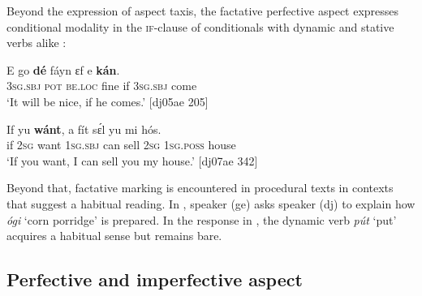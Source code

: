 Beyond the expression of aspect taxis, the factative perfective aspect expresses conditional modality in the \textsc{if-}clause of conditionals with dynamic  and stative verbs alike : 


\ea%
    \label{ex:key:320}
    \gll E    go  \textbf{dé}   fáyn    ɛf  e    \textbf{kán}.\\
\textsc{3sg.sbj}  \textsc{pot}  \textsc{be.loc}  fine    if  \textsc{3sg.sbj}  come\\

\glt ‘It will be nice, if he comes.’ [dj05ae 205]
\z


\ea%
    \label{ex:key:321}
    \gll If  yu  \textbf{wánt},  a    fít  sɛ́l  yu  mi    hós.\\
if  \textsc{2sg}  want  \textsc{1sg.sbj}  can  sell  \textsc{2sg}  \textsc{1sg.poss}  house\\

\glt ‘If you want, I can sell you my house.’ [dj07ae 342]
\z

Beyond that, factative marking is encountered in procedural texts in contexts that suggest a habitual reading. In , speaker (ge) asks speaker (dj) to explain how \textit{ógi} ‘corn porridge’ is prepared. In the response in , the dynamic verb \textit{pút} ‘put’ acquires a habitual sense but remains bare.


\ea%
    \label{ex:key:322a}
\z
\z

\subsection{Perfective and imperfective aspect}\label{sec:6.3.2}

